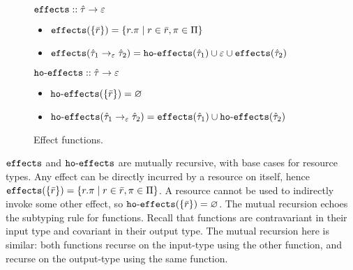 \begin{figure}[h]

$\mathtt{effects} :: \hat \tau \rightarrow \varepsilon$

\begin{itemize}
	\setlength\itemsep{-0.2em}
	\item[] $\mathtt{effects}(\{ \bar r \}) = \{ r.\pi \mid r \in \bar r, \pi \in \Pi \}$
	\item[] $\mathtt{effects}(\hat \tau_1 \rightarrow_{\varepsilon} \hat \tau_2) = \mathtt{ho \hbox{-} effects}(\hat \tau_1) \cup \varepsilon \cup \mathtt{effects}(\hat \tau_2)$
\end{itemize}

$\mathtt{ho \hbox{-} effects} :: \hat \tau \rightarrow \varepsilon$

\begin{itemize}
	\setlength\itemsep{-0.2em}
	\item[] $\mathtt{ho \hbox{-} effects}(\{ \bar r \}) = \varnothing$
	\item[] $\mathtt{ho \hbox{-} effects}(\hat \tau_1 \rightarrow_{\varepsilon} \hat \tau_2) = \mathtt{effects}(\hat \tau_1) \cup \mathtt{ho \hbox{-} effects}(\hat \tau_2)$
\end{itemize}

\vspace{-7pt}
\caption{Effect functions.}
\label{fig:fx_defns}
\end{figure}

$\mathtt{effects}$ and $\mathtt{ho \hbox{-} effects}$ are mutually recursive, with base cases for resource types. Any effect can be directly incurred by a resource on itself, hence $\mathtt{effects}(\{ \bar r \}) = \{ r.\pi \mid r \in \bar r, \pi \in \Pi \}$. A resource cannot be used to indirectly invoke some other effect, so $\mathtt{ho \hbox{-} effects}(\{ \bar r \}) = \varnothing$. The mutual recursion echoes the subtyping rule for functions. Recall that functions are contravariant in their input type and covariant in their output type. The mutual recursion here is similar: both functions recurse on the input-type using the other function, and recurse on the output-type using the same function.

